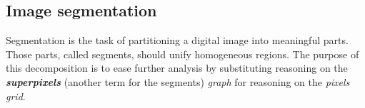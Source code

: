\subsection{Image segmentation}
Segmentation is the task of partitioning a digital image into meaningful parts. Those parts, called segments, should unify homogeneous regions. The purpose of this decomposition is to ease further analysis by substituting reasoning on the \textit{\textbf{superpixels}} (another term for the segments) {\it graph} for reasoning on the {\it pixels grid}. %


%

